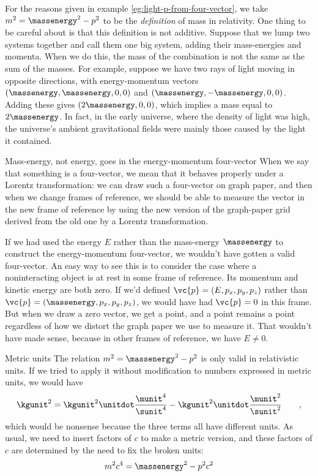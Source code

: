 For the reasons given in example \ref{eg:light-p-from-four-vector}, we take
$m^2 = \massenergy^2 - p^2$ to be the \emph{definition} of mass in relativity.
One thing to be careful about is that this definition is not additive. Suppose that we lump
two systems together and call them one big system, adding their mass-energies and momenta.
When we do this, the mass of the combination is not the same as  the sum of the masses.
For example, suppose we have two rays of light moving in opposite directions, with
energy-momentum vectors $(\massenergy,\massenergy,0,0)$ and $(\massenergy,-\massenergy,0,0)$.
Adding these gives $(2\massenergy,0,0)$, which implies a mass equal to $2\massenergy$. In
fact, in the early universe, where the density of light was high, the universe's ambient
gravitational fields were mainly those caused by the light it contained.

\begin{eg}{Mass-energy, not energy, goes in the energy-momentum four-vector}
When we say that something is a four-vector, we mean that it behaves properly under a Lorentz transformation:
we can draw such a four-vector on graph paper, and then when we change frames of reference, we should be able
to measure the vector in the new frame of reference by using the new version of the graph-paper grid derived
from the old one by a Lorentz transformation.

If we had used the energy $E$ rather than the mass-energy $\massenergy$ to
construct the energy-momentum four-vector, we wouldn't have gotten a valid four-vector.
An easy way to see this is to consider the case where a noninteracting object is at rest in some frame of reference.
Its momentum and kinetic energy are both zero.
If we'd defined $\vc{p}=(E,p_x,p_y,p_z)$ rather than $\vc{p}=(\massenergy,p_x,p_y,p_z)$, we would have had $\vc{p}=0$ in this
frame. But when we draw a zero vector, we get a point, and a point remains a point regardless of how
we distort the graph paper we use to measure it. That wouldn't have made sense, because in other frames
of reference, we  have $E\ne 0$.
\end{eg}

\begin{eg}{Metric units}
The relation $  m^2 = \massenergy^2 - p^2 $ is only valid in relativistic units. If we tried to apply it without
modification to numbers expressed in metric units, we would have
\begin{equation*}
  \kgunit^2 = \kgunit^2\unitdot\frac{\munit^4}{\sunit^4} - \kgunit^2\unitdot\frac{\munit^2}{\sunit^2} \qquad ,
\end{equation*}
which would be nonsense because the three terms all have different units. As usual, we need to insert factors
of $c$ to make a metric version, and these factors of $c$ are determined by the need to fix the broken units:
\begin{equation*}
  m^2c^4 = \massenergy^2 - p^2c^2
\end{equation*}
\end{eg}

